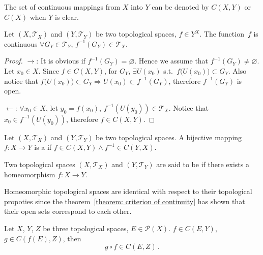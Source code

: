 \documentclass[openany]{book}
\begin{document}
The set of continuous mappings from $X$ into $Y$ can be denoted by $C(X, Y)$ or $C(X)$ when $Y$ is clear. 

\begin{theorem}
	\label{theorem: criterion of continuity}
	Let $(X, \mathscr T_X)$ and $(Y, \mathscr T_Y)$ be two topological spaces, $f \in Y^X$. 
	The function~$f$ is continuous  $\forall G_Y \in \mathscr T_Y$, $f^{-1} (G_Y) \in \mathscr T_X$.
\end{theorem}
\begin{proof}
	$\to$: 
	It is obvious if $f^{-1}(G_Y) = \varnothing$. 
	Hence we assume that $f^{-1}(G_Y) \neq \varnothing$. 
	Let $x_0 \in X$. 
	Since $f \in C(X, Y)$, for $G_Y$, $\exists U( x_0) $ s.t.\ $f\big(U(x_0) \big) \subset G_Y$. 
	Also notice that $f\big(U(x_0) \big) \subset G_Y \Rightarrow  U(x_0) \subset f^{-1}(G_Y)$, therefore $f^{-1}(G_Y)$ is open.

	$\gets$: 
	$\forall x_0 \in X$, let $y_0 = f(x_0)$, $f^{-1} (U( y_0)) \in \mathscr T_X$. 
	Notice that $x_0 \in f^{-1}(U( y_0))$, therefore $f \in C(X, Y) $.
\end{proof}

\begin{definition}[Homeomorphism]\label{definition: homeomorphism}
	Let $(X, \mathscr T_X)$ and $(Y, \mathscr T_Y)$ be two topological spaces. 
	A bijective mapping $f \colon X \to Y$ is a  if $f \in C(X, Y) \wedge f^{-1} \in C(Y, X)$. 
\end{definition}

\begin{definition}\label{definition: homeomorphic}
	Two topological spaces $(X,\mathscr T_X)$ and $(Y,\mathscr T_Y)$ are said to be  if there exists a homeomorphism $f \colon X \to Y$.
\end{definition}

Homeomorphic topological spaces are identical with respect to their topological propoties since the theorem~\ref{theorem: criterion of continuity} has shown that their open sets correspond to each other.

\begin{theorem}
	Let $X$, $Y$, $Z$ be three topological spaces, $E \in \mathscr P(X)$. 
	$f \in C(E, Y)$, $g \in C(f(E), Z)$, then
	\begin{equation*}
		g \circ f \in C(E, Z) \,.
	\end{equation*}
\end{theorem}
\end{document}
